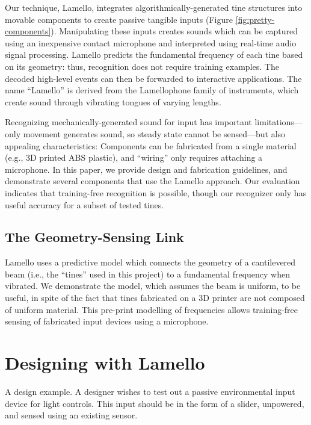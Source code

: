 Our technique, Lamello, integrates algorithmically-generated tine structures into movable components to create passive tangible inputs (Figure \ref{fig:pretty-components}). Manipulating these inputs creates sounds which can be captured using an inexpensive contact microphone and interpreted using real-time audio signal processing. Lamello predicts the fundamental frequency of each tine based on its geometry: thus, recognition does not require training examples. The decoded high-level events can then be forwarded to interactive applications. The name ``Lamello'' is derived from the Lamellophone family of instruments, which create sound through vibrating tongues of varying lengths. 

Recognizing mechanically-generated sound for input has important limitations---only movement generates sound, so steady state cannot be sensed---but also appealing characteristics: Components can be fabricated from a single material (e.g., 3D printed ABS plastic), and ``wiring'' only requires attaching a microphone. In this paper, we provide design and fabrication guidelines, and demonstrate several components that use the Lamello approach. Our evaluation indicates that training-free recognition is possible, though our recognizer only has useful accuracy for a subset of tested tines.

    \subsection{The Geometry-Sensing Link}
    Lamello uses a predictive model which connects the geometry of a cantilevered beam (i.e., the ``tines'' used in this project) to a fundamental frequency when vibrated. We demonstrate the model, which assumes the beam is uniform, to be useful, in spite of the fact that tines fabricated on a 3D printer are not composed of uniform material. This pre-print modelling of frequencies allows training-free sensing of fabricated input devices using a microphone.
    
\section{Designing with Lamello}
     A design example. A designer wishes to test out a passive environmental input device for light controls. This input should be in the form of a slider, unpowered, and sensed using an existing sensor.
    
